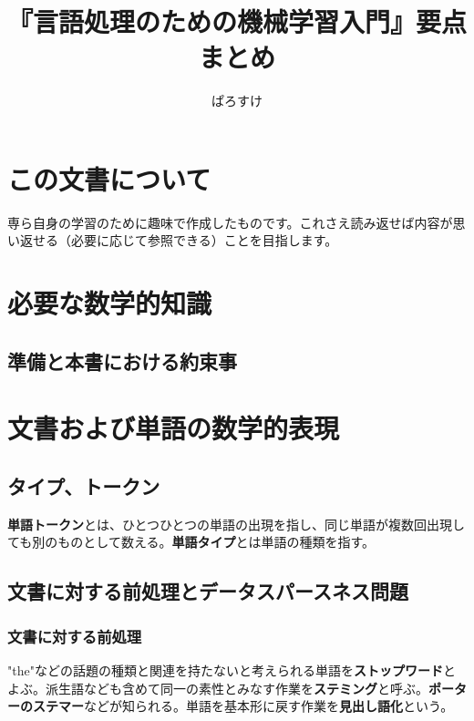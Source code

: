 \documentclass{jsarticle}
\begin{document}
\title{『言語処理のための機械学習入門』要点まとめ}
\author{ぱろすけ}
\maketitle

\setcounter{section}{-1}

\section{この文書について}
専ら自身の学習のために趣味で作成したものです。これさえ読み返せば内容が思い返せる（必要に応じて参照できる）ことを目指します。



\section{必要な数学的知識}

\subsection{準備と本書における約束事}



\section{文書および単語の数学的表現}

\subsection{タイプ、トークン}
\textbf{単語トークン}とは、ひとつひとつの単語の出現を指し、同じ単語が複数回出現しても別のものとして数える。\textbf{単語タイプ}とは単語の種類を指す。

\setcounter{subsection}{3}
\subsection{文書に対する前処理とデータスパースネス問題}

\subsubsection{文書に対する前処理}

"the"などの話題の種類と関連を持たないと考えられる単語を\textbf{ストップワード}とよぶ。派生語なども含めて同一の素性とみなす作業を\textbf{ステミング}と呼ぶ。\textbf{ポーターのステマー}などが知られる。単語を基本形に戻す作業を\textbf{見出し語化}という。
\end{document}
